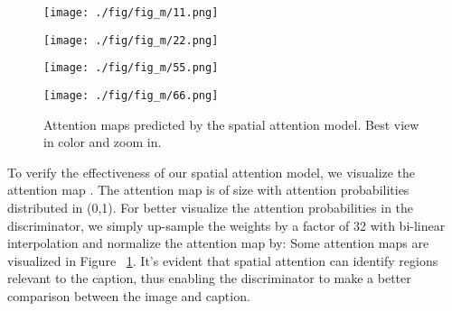 \documentclass{article}
\begin{document}
\begin{figure}[t!]
	\begin{minipage}[c]{0.01\textwidth}
	\end{minipage}
	\hfill
	\begin{minipage}{0.11\textwidth}
		\texttt{[image: ./fig/fig\_m/11.png]}
	\end{minipage}
	\hfill
	\begin{minipage}{0.11\textwidth}
		\texttt{[image: ./fig/fig\_m/22.png]}
	\end{minipage}
	\hfill
	\begin{minipage}{0.11\textwidth}
		\texttt{[image: ./fig/fig\_m/55.png]}
	\end{minipage}
	\hfill
	\begin{minipage}{0.11\textwidth}
		\texttt{[image: ./fig/fig\_m/66.png]}
	\end{minipage}


	\vspace{2pt}
	
	

	\caption{Attention maps predicted by the spatial attention model. Best view in color and zoom in.}
	\label{Fig:att_mask}
	\vspace{-4mm}
\end{figure}

	To verify the effectiveness of our spatial attention model, we visualize the attention map . 
	The attention map is of size  with attention probabilities distributed in (0,1). For better visualize the attention probabilities in the discriminator, we simply up-sample the weights by a factor of 32 with bi-linear interpolation and normalize the attention map by: 
	Some attention maps are visualized in Figure ~\ref{Fig:att_mask}. It's evident that spatial attention can identify regions relevant to the caption, thus enabling the discriminator to make a better comparison between the image and caption. 
	
	
	
\end{document}
